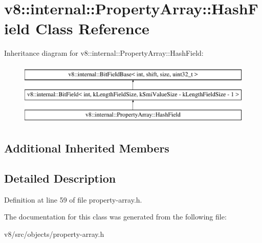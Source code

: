 \hypertarget{classv8_1_1internal_1_1PropertyArray_1_1HashField}{}\section{v8\+:\+:internal\+:\+:Property\+Array\+:\+:Hash\+Field Class Reference}
\label{classv8_1_1internal_1_1PropertyArray_1_1HashField}
Inheritance diagram for v8\+:\+:internal\+:\+:Property\+Array\+:\+:Hash\+Field\+:\begin{figure}[H]
\begin{center}
\leavevmode
\includegraphics[height=3.000000cm]{classv8_1_1internal_1_1PropertyArray_1_1HashField}
\end{center}
\end{figure}
\subsection*{Additional Inherited Members}


\subsection{Detailed Description}


Definition at line 59 of file property-\/array.\+h.



The documentation for this class was generated from the following file\+:\begin{DoxyCompactItemize}
\item 
v8/src/objects/property-\/array.\+h\end{DoxyCompactItemize}
